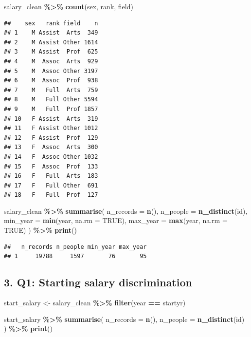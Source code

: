 \documentclass[
]{article}
\newenvironment{Shaded}{\begin{snugshade}}{\end{snugshade}}
\newcommand{\AttributeTok}[1]{\textcolor[rgb]{0.13,0.29,0.53}{#1}}
\newcommand{\ConstantTok}[1]{\textcolor[rgb]{0.56,0.35,0.01}{#1}}
\newcommand{\FunctionTok}[1]{\textcolor[rgb]{0.13,0.29,0.53}{\textbf{#1}}}
\newcommand{\NormalTok}[1]{#1}
\newcommand{\OtherTok}[1]{\textcolor[rgb]{0.56,0.35,0.01}{#1}}
\newcommand{\SpecialCharTok}[1]{\textcolor[rgb]{0.81,0.36,0.00}{\textbf{#1}}}
\begin{document}
\begin{Shaded}
\begin{Highlighting}[]
\NormalTok{salary\_clean }\SpecialCharTok{\%\textgreater{}\%}
  \FunctionTok{count}\NormalTok{(sex, rank, field)}
\end{Highlighting}
\end{Shaded}

\begin{verbatim}
##    sex   rank field    n
## 1    M Assist  Arts  349
## 2    M Assist Other 1614
## 3    M Assist  Prof  625
## 4    M  Assoc  Arts  929
## 5    M  Assoc Other 3197
## 6    M  Assoc  Prof  938
## 7    M   Full  Arts  759
## 8    M   Full Other 5594
## 9    M   Full  Prof 1857
## 10   F Assist  Arts  319
## 11   F Assist Other 1012
## 12   F Assist  Prof  129
## 13   F  Assoc  Arts  300
## 14   F  Assoc Other 1032
## 15   F  Assoc  Prof  133
## 16   F   Full  Arts  183
## 17   F   Full Other  691
## 18   F   Full  Prof  127
\end{verbatim}

\begin{Shaded}
\begin{Highlighting}[]
\NormalTok{salary\_clean }\SpecialCharTok{\%\textgreater{}\%}
  \FunctionTok{summarise}\NormalTok{(}
    \AttributeTok{n\_records =} \FunctionTok{n}\NormalTok{(),}
    \AttributeTok{n\_people =} \FunctionTok{n\_distinct}\NormalTok{(id),}
    \AttributeTok{min\_year =} \FunctionTok{min}\NormalTok{(year, }\AttributeTok{na.rm =} \ConstantTok{TRUE}\NormalTok{),}
    \AttributeTok{max\_year =} \FunctionTok{max}\NormalTok{(year, }\AttributeTok{na.rm =} \ConstantTok{TRUE}\NormalTok{)}
\NormalTok{  ) }\SpecialCharTok{\%\textgreater{}\%}
  \FunctionTok{print}\NormalTok{()}
\end{Highlighting}
\end{Shaded}

\begin{verbatim}
##   n_records n_people min_year max_year
## 1     19788     1597       76       95
\end{verbatim}

\subsection{3. Q1: Starting salary
discrimination}\label{q1-starting-salary-discrimination}

\begin{Shaded}
\begin{Highlighting}[]
\NormalTok{start\_salary }\OtherTok{\textless{}{-}}\NormalTok{ salary\_clean }\SpecialCharTok{\%\textgreater{}\%}
  \FunctionTok{filter}\NormalTok{(year }\SpecialCharTok{==}\NormalTok{ startyr)}

\NormalTok{start\_salary }\SpecialCharTok{\%\textgreater{}\%}
  \FunctionTok{summarise}\NormalTok{(}
    \AttributeTok{n\_records =} \FunctionTok{n}\NormalTok{(),}
    \AttributeTok{n\_people =} \FunctionTok{n\_distinct}\NormalTok{(id)}
\NormalTok{  ) }\SpecialCharTok{\%\textgreater{}\%}
  \FunctionTok{print}\NormalTok{()}
\end{Highlighting}
\end{Shaded}
\end{document}
